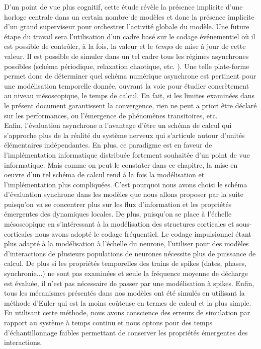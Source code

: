 D'un point de vue plus cognitif, cette étude révèle la présence implicite d'une horloge centrale dans un certain nombre de modèles et donc la présence implicite d'un grand superviseur pour orchestrer l'activité globale du modèle. Une future étape du travail sera l'utilisation d'un cadre basé sur le codage événementiel où il est possible de contrôler, à la fois, la valeur et le {\em temps} de mise à jour de cette valeur. Il est possible de simuler dans un tel cadre tous les régimes asynchrones possibles (schéma périodique, relaxation chaotique, etc. \cite {Chazan:1969, Amitai:1993}). Une telle plate-forme permet donc de déterminer quel schéma numérique asynchrone est pertinent pour une modélisation temporelle donnée, ouvrant la voie pour étudier concrètement au niveau mésoscopique, le temps de calcul. En fait, si les limites examinées dans le présent document garantissent la convergence, rien ne peut a priori être déclaré sur les performances, ou l'émergence de phénomènes transitoires, etc.\\

Enfin, l'évaluation asynchrone a l'avantage d'être un schéma de calcul qui s'approche plus de la réalité du système nerveux qui s'articule autour d'unités élémentaires indépendantes. En plus, ce paradigme est en faveur de l'implémentation informatique distribuée fortement souhaitée d'un point de vue informatique. Mais comme on peut le constater dans ce chapitre, la mise en oeuvre d'un tel schéma de calcul rend à la fois la modélisation et l'implémentation plus compliquées. C'est pourquoi nous avons choisi le schéma d'évaluation synchrone dans les modèles que nous allons proposer par la suite puisqu'on va se concentrer plus sur les flux d'information et les propriétés émergentes des dynamiques locales. De plus, puisqu'on se place à l'échelle mésoscopique en s'intéressant à la modélisation des structures corticales et sous-corticales nous avons adopté le codage fréquentiel. Le codage impulsionnel étant plus adapté à la modélisation à l'échelle du neurone, l'utiliser pour des modèles d'interactions de plusieurs populations de neurones nécessite plus de puissance de calcul. De plus si les propriétés temporelles des trains de spikes (dates, phases, synchronie...) ne sont pas examinées et seule la fréquence moyenne de décharge est évaluée, il n'est pas nécessaire de passer par une modélisation à spikes. Enfin, tous les mécanismes présentés dans nos modèles ont été simulés en utilisant la méthode d'Euler qui est la moins coûteuse en termes de calcul et la plus simple. En utilisant cette méthode, nous avons conscience des erreurs de simulation par rapport au système à temps continu et nous optons pour des temps d'échantillonnage faibles permettant de conserver les propriétés émergentes des interactions.


